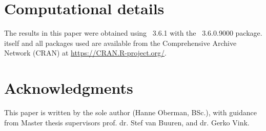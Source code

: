 \documentclass[article]{jss}
\begin{document}
\section*{Computational details}

The results in this paper were obtained using ~3.6.1 with the ~3.6.0.9000 package.  itself and all packages used are available from the Comprehensive  Archive Network (CRAN) at \url{https://CRAN.R-project.org/}.


\section*{Acknowledgments}

This paper is written by the sole author (Hanne Oberman, BSc.), with guidance from Master thesis supervisors prof. dr. Stef van Buuren, and dr. Gerko Vink.






\newpage

\begin{appendix}

\end{appendix}

\end{document}
